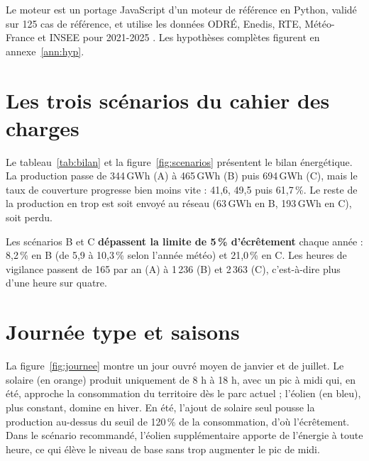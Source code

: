 \documentclass[11pt, a4paper]{report}
\newcommand{\pct}{\,\%}
\newcommand{\gwh}{\,GWh}
\begin{document}
Le moteur est un portage JavaScript d'un moteur de référence en Python, validé sur 125 cas de référence, et utilise les données ODRÉ, Enedis, RTE, Météo-France et INSEE pour 2021-2025 \cite{odre_registre,rte_eco2mix,enedis_profils,meteo_france}. Les hypothèses complètes figurent en annexe~\ref{ann:hyp}.

\section{Les trois scénarios du cahier des charges}

Le tableau~\ref{tab:bilan} et la figure~\ref{fig:scenarios} présentent le bilan énergétique. La production passe de 344\gwh{} (A) à 465\gwh{} (B) puis 694\gwh{} (C), mais le taux de couverture progresse bien moins vite : 41,6, 49,5 puis 61,7\pct. Le reste de la production en trop est soit envoyé au réseau (63\gwh{} en B, 193\gwh{} en C), soit perdu.

% 


Les scénarios B et C \textbf{dépassent la limite de 5\pct{} d'écrêtement} chaque année : 8,2\pct{} en B (de 5,9 à 10,3\pct{} selon l'année météo) et 21,0\pct{} en C. Les heures de vigilance passent de 165 par an (A) à 1\,236 (B) et 2\,363 (C), c'est-à-dire plus d'une heure sur quatre.

\section{Journée type et saisons}

La figure~\ref{fig:journee} montre un jour ouvré moyen de janvier et de juillet. Le solaire (en orange) produit uniquement de 8 h à 18 h, avec un pic à midi qui, en été, approche la consommation du territoire dès le parc actuel ; l'éolien (en bleu), plus constant, domine en hiver. En été, l'ajout de solaire seul pousse la production au-dessus du seuil de 120\pct{} de la consommation, d'où l'écrêtement. Dans le scénario recommandé, l'éolien supplémentaire apporte de l'énergie à toute heure, ce qui élève le niveau de base sans trop augmenter le pic de midi.
\end{document}
